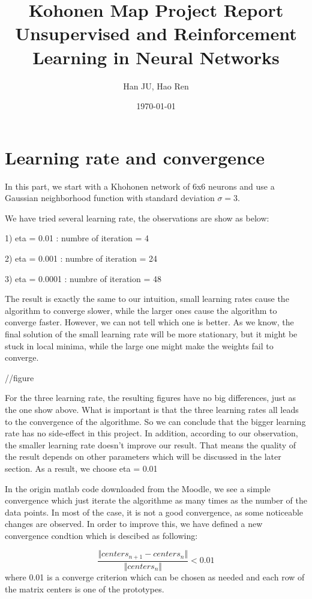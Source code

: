 \documentclass[a4paper, 12pt]{article}
\title{Kohonen Map Project Report \\ \vspace{0.5cm} \large Unsupervised and Reinforcement Learning in Neural Networks}
\author{Han JU, Hao Ren}
\date{\today}
\begin{document}
\maketitle

\section{Learning rate and convergence}
In this part, we start with a Khohonen network of 6x6 neurons and use a Gaussian neighborhood function with standard deviation $\sigma = 3$.

We have tried several learning rate, the observations are show as below:

1) eta = 0.01 : numbre of iteration = 4

2) eta = 0.001 : numbre of iteration = 24

3) eta = 0.0001 : numbre of iteration = 48

The result is exactly the same to our intuition, small learning rates cause the algorithm to converge slower, while the larger ones cause the algorithm to converge faster. However, we can not tell which one is better. As we know, the final solution of the small learning rate will be more stationary, but it might be stuck in local minima, while the large one might make the weights fail to converge.

//figure

For the three learning rate, the resulting figures have no big differences, just as the one show above. What is important is that the three learning rates all leads to the convergence of the algorithme. So we can conclude that the bigger learning rate has no side-effect in this project. In addition, according to our observation, the smaller learning rate doesn't improve our result. That means the quality of the result depends on other parameters which will be discussed in the later section. As a result, we choose eta = 0.01

In the origin matlab code downloaded from the Moodle, we see a simple convergence which just iterate the algorithme as many times as the number of the data points. In most of the case, it is not a good convergence, as some noticeable changes are observed. In order to improve this, we have defined a new convergence condtion which is descibed as following:

\begin{equation}\frac{\Vert centers_{n+1} - centers_n\Vert}{\Vert centers_n \Vert}  < 0.01\end{equation}where 0.01 is a converge criterion which can be chosen as needed and each row of the matrix centers is one of the prototypes. 
\end{document}
